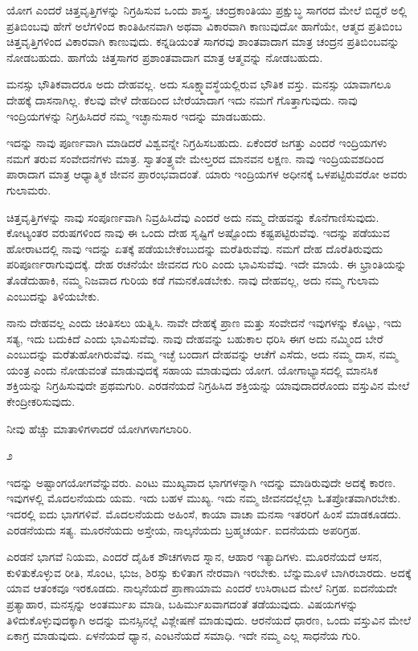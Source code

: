 ಯೋಗ ಎಂದರೆ ಚಿತ್ತವೃತ್ತಿಗಳನ್ನು ನಿಗ್ರಹಿಸುವ ಒಂದು ಶಾಸ್ತ್ರ. ಚಂದ್ರಕಾಂತಿಯು ಪ್ರಕ್ಷುಬ್ಧ ಸಾಗರದ ಮೇಲೆ ಬಿದ್ದರೆ ಅಲ್ಲಿ ಪ್ರತಿಬಿಂಬವು ಹೇಗೆ ಅಲೆಗಳಿಂದ ಕಾಂತಿಹೀನವಾಗಿ ಅಥವಾ ವಿಕಾರವಾಗಿ ಕಾಣುವುದೋ ಹಾಗೆಯೇ, ಆತ್ಮದ ಪ್ರತಿಬಿಂಬ ಚಿತ್ತವೃತ್ತಿಗಳಿಂದ ವಿಕಾರವಾಗಿ ಕಾಣುವುದು. ಕನ್ನಡಿಯಂತೆ ಸಾಗರವು ಶಾಂತವಾದಾಗ ಮಾತ್ರ ಚಂದ್ರನ ಪ್ರತಿಬಿಂಬವನ್ನು ನೋಡಬಹುದು. ಹಾಗೆಯೆ ಚಿತ್ತಸಾಗರ ಪ್ರಶಾಂತವಾದಾಗ ಮಾತ್ರ ಆತ್ಮವನ್ನು ನೋಡಬಹುದು.

ಮನಸ್ಸು ಭೌತಿಕವಾದರೂ ಅದು ದೇಹವಲ್ಲ. ಅದು ಸೂಕ್ಷ್ಮಾವಸ್ಥೆಯಲ್ಲಿರುವ ಭೌತಿಕ ವಸ್ತು. ಮನಸ್ಸು ಯಾವಾಗಲೂ ದೇಹಕ್ಕೆ ದಾಸನಾಗಿಲ್ಲ. ಕೆಲವು ವೇಳೆ ದೇಹದಿಂದ ಬೇರೆಯಾದಾಗ ಇದು ನಮಗೆ ಗೊತ್ತಾಗುವುದು. ನಾವು ಇಂದ್ರಿಯಗಳನ್ನು ನಿಗ್ರಹಿಸಿದರೆ ನಮ್ಮ ಇಚ್ಛಾನುಸಾರ ಇದನ್ನು ಮಾಡಬಹುದು.

ಇದನ್ನು ನಾವು ಪೂರ್ಣವಾಗಿ ಮಾಡಿದರೆ ವಿಶ್ವವನ್ನೇ ನಿಗ್ರಹಿಸಬಹುದು. ಏಕೆಂದರೆ ಜಗತ್ತು ಎಂದರೆ ಇಂದ್ರಿಯಗಳು ನಮಗೆ ತರುವ ಸಂವೇದನೆಗಳು ಮಾತ್ರ. ಸ್ವಾತಂತ್ರ್ಯವೇ ಮೇಲ್ತರದ ಮಾನವನ ಲಕ್ಷಣ. ನಾವು ಇಂದ್ರಿಯವಶದಿಂದ ಪಾರಾದಾಗ ಮಾತ್ರ ಆಧ್ಯಾತ್ಮಿಕ ಜೀವನ ಪ್ರಾರಂಭವಾದಂತೆ. ಯಾರು ಇಂದ್ರಿಯಗಳ ಅಧೀನಕ್ಕೆ ಒಳಪಟ್ಟಿರುವರೋ ಅವರು ಗುಲಾಮರು.

ಚಿತ್ತವೃತ್ತಿಗಳನ್ನು ನಾವು ಸಂಪೂರ್ಣವಾಗಿ ನಿವ್ರಹಿಸಿದೆವು ಎಂದರೆ ಅದು ನಮ್ಮ ದೇಹವನ್ನು ಕೊನೆಗಾಣಿಸುವುದು. ಕೋಟ್ಯಂತರ ವರುಷಗಳಿಂದ ನಾವು ಈ ಒಂದು ದೇಹ ಸೃಷ್ಟಿಗೆ ಅಷ್ಟೊಂದು ಕಷ್ಟಪಟ್ಟಿರುವೆವು. ಇದನ್ನು ಪಡೆಯುವ ಹೋರಾಟದಲ್ಲಿ ನಾವು ಇದನ್ನು ಏತಕ್ಕೆ ಪಡೆಯಬೇಕೆಂಬುದನ್ನು ಮರೆತಿರುವೆವು. ನಮಗೆ ದೇಹ ದೊರೆತಿರುವುದು ಪರಿಪೂರ್ಣರಾಗುವುದಕ್ಕೆ. ದೇಹ ರಚನೆಯೇ ಜೀವನದ ಗುರಿ ಎಂದು ಭಾವಿಸುವೆವು. ಇದೇ ಮಾಯೆ. ಈ ಭ್ರಾಂತಿಯನ್ನು ತೊಡೆದುಹಾಕಿ, ನಮ್ಮ ನಿಜವಾದ ಗುರಿಯ ಕಡೆ ಗಮನಕೊಡಬೇಕು. ನಾವು ದೇಹವಲ್ಲ, ಅದು ನಮ್ಮ ಗುಲಾಮ ಎಂಬುದನ್ನು ತಿಳಿಯಬೇಕು.

ನಾನು ದೇಹವಲ್ಲ ಎಂದು ಚಿಂತಿಸಲು ಯತ್ನಿಸಿ. ನಾವೇ ದೇಹಕ್ಕೆ ಪ್ರಾಣ ಮತ್ತು ಸಂವೇದನೆ ಇವುಗಳನ್ನು ಕೊಟ್ಟು, ಇದು ಸತ್ಯ, ಇದು ಬದುಕಿದೆ ಎಂದು ಭಾವಿಸುವೆವು. ನಾವು ದೇಹವನ್ನು ಬಹುಕಾಲ ಧರಿಸಿ ಈಗ ಅದು ನಮ್ಮಿಂದ ಬೇರೆ ಎಂಬುದನ್ನು ಮರೆತುಹೋಗಿರುವೆವು. ನಮ್ಮ ಇಚ್ಛೆ ಬಂದಾಗ ದೇಹವನ್ನು ಆಚೆಗೆ ಎಸೆದು, ಅದು ನಮ್ಮ ದಾಸ, ನಮ್ಮ ಯಂತ್ರ ಎಂದು ನೋಡುವಂತೆ ಮಾಡುವುದಕ್ಕೆ ಸಹಾಯ ಮಾಡುವುದು ಯೋಗ. ಯೋಗಾಭ್ಯಾಸದಲ್ಲಿ ಮಾನಸಿಕ ಶಕ್ತಿಯನ್ನು ನಿಗ್ರಹಿಸುವುದೇ ಪ್ರಥಮಗುರಿ. ಎರಡನೆಯದೆ ನಿಗ್ರಹಿಸಿದ ಶಕ್ತಿಯನ್ನು ಯಾವುದಾದರೊಂದು ವಸ್ತುವಿನ ಮೇಲೆ ಕೇಂದ್ರೀಕರಿಸುವುದು.

ನೀವು ಹೆಚ್ಚು ಮಾತಾಳಿಗಳಾದರೆ ಯೋಗಿಗಳಾಗಲಾರಿರಿ.

\begin{center}
೨
\end{center}

ಇದನ್ನು ಅಷ್ಟಾಂಗಯೋಗವೆನ್ನುವರು. ಎಂಟು ಮುಖ್ಯವಾದ ಭಾಗಗಳನ್ನಾಗಿ ಇದನ್ನು ಮಾಡಿರುವುದೇ ಅದಕ್ಕೆ ಕಾರಣ. ಇವುಗಳಲ್ಲಿ ಮೊದಲನೆಯದು ಯಮ. ಇದು ಬಹಳ ಮುಖ್ಯ. ಇದು ನಮ್ಮ ಜೀವನದಲ್ಲೆಲ್ಲಾ ಓತಪ್ರೋತವಾಗಿರಬೇಕು. ಇದರಲ್ಲಿ ಐದು ಭಾಗಗಳಿವೆ. ಮೊದಲನೆಯದು ಅಹಿಂಸೆ, ಕಾಯಾ ವಾಚಾ ಮನಸಾ ಇತರರಿಗೆ ಹಿಂಸೆ ಮಾಡಕೂಡದು. ಎರಡನೆಯದು ಸತ್ಯ. ಮೂರನೆಯದು ಅಸ್ತೇಯ, ನಾಲ್ಕನೆಯದು ಬ್ರಹ್ಮಚರ್ಯ. ಐದನೆಯದು ಅಪರಿಗ್ರಹ.

ಎರಡನೆ ಭಾಗವೆ ನಿಯಮ, ಎಂದರೆ ದೈಹಿಕ ಶೌಚಗಳಾದ ಸ್ನಾನ, ಆಹಾರ ಇತ್ಯಾದಿಗಳು. ಮೂರನೆಯದೆ ಆಸನ, ಕುಳಿತುಕೊಳ್ಳುವ ರೀತಿ, ಸೊಂಟ, ಭುಜ, ಶಿರಸ್ಸು ಕುಳಿತಾಗ ನೇರವಾಗಿ ಇರಬೇಕು. ಬೆನ್ನುಮೂಳೆ ಬಾಗಿರಬಾರದು. ಅದಕ್ಕೆ ಯಾವ ಆತಂಕವೂ ಇರಕೂಡದು. ನಾಲ್ಕನೆಯದೆ ಪ್ರಾಣಾಯಾಮ ಎಂದರೆ ಉಸಿರಾಟದ ಮೇಲೆ ನಿಗ್ರಹ. ಐದನೆಯದೇ ಪ್ರತ್ಯಾಹಾರ, ಮನಸ್ಸನ್ನು ಅಂತರ್ಮುಖ ಮಾಡಿ, ಬಹಿರ್ಮುಖವಾಗದಂತೆ ತಡೆಯುವುದು. ವಿಷಯಗಳನ್ನು ತಿಳಿದುಕೊಳ್ಳುವುದಕ್ಕಾಗಿ ಅದನ್ನು ಮನಸ್ಸಿನಲ್ಲೆ ವಿಶ್ಲೇಷಣೆ ಮಾಡುವುದು. ಆರನೆಯದೆ ಧಾರಣ, ಒಂದು ವಸ್ತುವಿನ ಮೇಲೆ ಏಕಾಗ್ರ ಮಾಡುವುದು. ಏಳನೆಯದೆ ಧ್ಯಾನ, ಎಂಟನೆಯದೆ ಸಮಾಧಿ. ಇದೇ ನಮ್ಮ ಎಲ್ಲ ಸಾಧನೆಯ ಗುರಿ.

